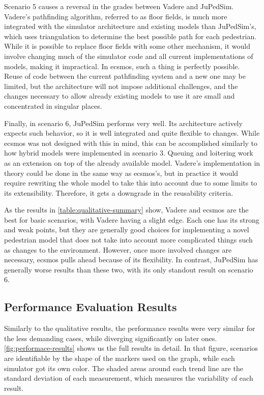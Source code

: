 \documentclass[twoside, 11pt]{article}
\begin{document}
Scenario 5 causes a reversal in the grades between Vadere and JuPedSim. Vadere's pathfinding algorithm, referred to as floor fields, is much more integrated with the simulator architecture and existing models than JuPedSim's, which uses triangulation to determine the best possible path for each pedestrian. While it is possible to replace floor fields with some other mechanism, it would involve changing much of the simulator code and all current implementations of models, making it impractical. In \gls{ecsmos}, such a thing is perfectly possible. Reuse of code between the current pathfinding system and a new one may be limited, but the architecture will not impose additional challenges, and the changes necessary to allow already existing models to use it are small and concentrated in singular places.

Finally, in scenario 6, JuPedSim performs very well. Its architecture actively expects such behavior, so it is well integrated and quite flexible to changes. While \gls{ecsmos} was not designed with this in mind, this can be accomplished similarly to how hybrid models were implemented in scenario 3. Queuing and loitering work as an extension on top of the already available model. Vadere's implementation in theory could be done in the same way as \gls{ecsmos}'s, but in practice it would require rewriting the whole model to take this into account due to some limits to its extensibility. Therefore, it gets a downgrade in the reusability criteria.

As the results in  \autoref{table:qualitative-summary} show, Vadere and \gls{ecsmos} are the best for basic scenarios, with Vadere having a slight edge. Each one has its strong and weak points, but they are generally good choices for implementing a novel pedestrian model that does not take into account more complicated things such as changes to the environment. However, once more involved changes are necessary, \gls{ecsmos} pulls ahead because of its flexibility. In contrast, JuPedSim has generally worse results than these two, with its only standout result on scenario 6.


\subsection{Performance Evaluation Results}

Similarly to the qualitative results, the performance results were very similar for the less demanding cases, while diverging significantly on later ones. \autoref{fig:performace-results} shows us the full results in detail. In that figure, scenarios are identifiable by the shape of the markers used on the graph, while each simulator got its own color. The shaded areas around each trend line are the standard deviation of each measurement, which measures the variability of each result.
\end{document}
